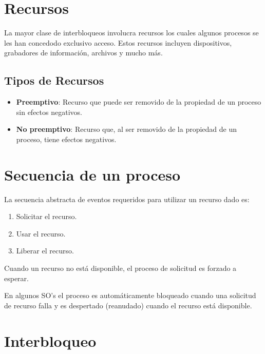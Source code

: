 \documentclass[12pt, a4paper]{article} %
\begin{document}
\clearpage
\tableofcontents

	

\clearpage
\section{Recursos}

La mayor clase de interbloqueos involucra recursos los cuales algunos procesos se les han concedodo exclusivo acceso. Estos recursos incluyen dispositivos, grabadores de información, archivos y mucho más.

\subsection{Tipos de Recursos}

\begin{itemize}
    \item \textbf{Preemptivo}: Recurso que puede ser removido de la propiedad de un proceso sin efectos negativos.
    \item \textbf{No preemptivo}: Recurso que, al ser removido de la propiedad de un proceso, tiene efectos negativos.
\end{itemize}

\section{Secuencia de un proceso}

La secuencia abstracta de eventos requeridos para utilizar un recurso dado es:

\begin{enumerate}
    \item Solicitar el recurso.
    \item Usar el recurso.
    \item Liberar el recurso.
\end{enumerate}

Cuando un recurso no está disponible, el proceso de solicitud es forzado a esperar.

En algunos SO's el proceso es automáticamente bloqueado cuando una solicitud de recurso falla y es despertado (reanudado) cuando el recurso está disponible.

\section{Interbloqueo}
\end{document}
